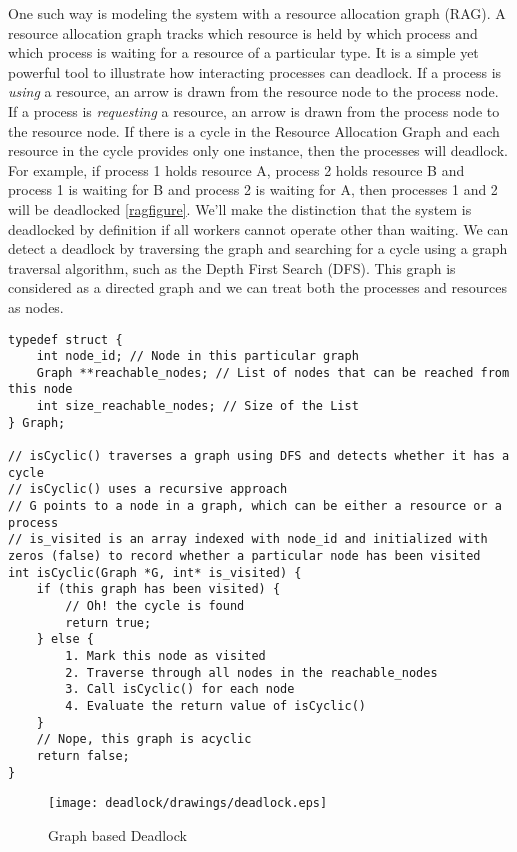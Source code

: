 One such way is modeling the system with a resource allocation graph (\gls{RAG}).
A resource allocation graph tracks which resource is held by which process and which process is waiting for a resource of a particular type.
It is a simple yet powerful tool to illustrate how interacting processes can deadlock.
If a process is \emph{using} a resource, an arrow is drawn from the resource node to the process node.
If a process is \emph{requesting} a resource, an arrow is drawn from the process node to the resource node.
If there is a cycle in the Resource Allocation Graph and each resource in the cycle provides only one instance, then the processes will deadlock.
For example, if process 1 holds resource A, process 2 holds resource B and process 1 is waiting for B and process 2 is waiting for A, then processes 1 and 2 will be deadlocked \ref{ragfigure}.
We'll make the distinction that the system is deadlocked by definition if all workers cannot operate other than waiting.
We can detect a deadlock by traversing the graph and searching for a cycle using a graph traversal algorithm, such as the Depth First Search (DFS).
This graph is considered as a directed graph and we can treat both the processes and resources as nodes.

\begin{verbatim}
typedef struct {
    int node_id; // Node in this particular graph
    Graph **reachable_nodes; // List of nodes that can be reached from this node
    int size_reachable_nodes; // Size of the List
} Graph;

// isCyclic() traverses a graph using DFS and detects whether it has a cycle
// isCyclic() uses a recursive approach
// G points to a node in a graph, which can be either a resource or a process
// is_visited is an array indexed with node_id and initialized with zeros (false) to record whether a particular node has been visited
int isCyclic(Graph *G, int* is_visited) {
    if (this graph has been visited) {
        // Oh! the cycle is found
        return true;
    } else {
        1. Mark this node as visited
        2. Traverse through all nodes in the reachable_nodes
        3. Call isCyclic() for each node
        4. Evaluate the return value of isCyclic()
    }
    // Nope, this graph is acyclic
    return false;
}
\end{verbatim}

\begin{figure}[H]
\centering
\texttt{[image: deadlock/drawings/deadlock.eps]}
\caption{Graph based Deadlock}
\end{figure}

